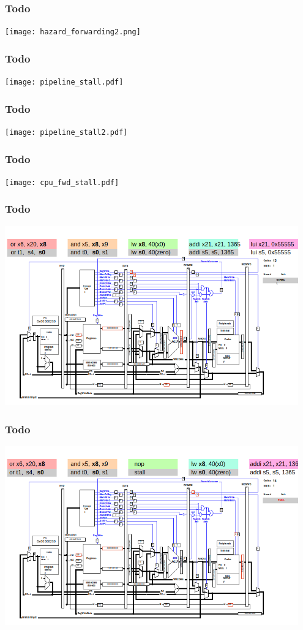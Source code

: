 \documentclass{beamer}
\begin{document}
\begin{frame}
\frametitle{Todo}
\texttt{[image: hazard\_forwarding2.png]}
\end{frame}

\begin{frame}
\frametitle{Todo}
\texttt{[image: pipeline\_stall.pdf]}
\end{frame}

\begin{frame}
\frametitle{Todo}
\texttt{[image: pipeline\_stall2.pdf]}
\end{frame}

\begin{frame}
\frametitle{Todo}
\texttt{[image: cpu\_fwd\_stall.pdf]}
\end{frame}

\begin{frame}
\frametitle{Todo}
\includegraphics[width=0.95\textwidth]{fig/hazard-stall-qtrvsim2.png}
\end{frame}

\begin{frame}
\frametitle{Todo}
\includegraphics[width=0.95\textwidth]{fig/hazard-stall-qtrvsim3.png}
\end{frame}
\end{document}
